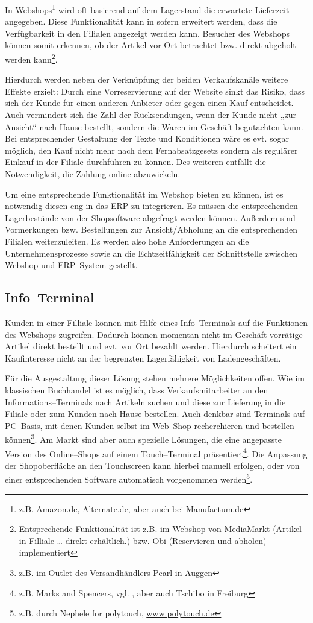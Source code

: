 In Webshops\footnote{z.B. Amazon.de, Alternate.de, aber auch bei Manufactum.de} wird oft basierend auf dem Lagerstand die erwartete Lieferzeit angegeben. Diese Funktionalität kann in sofern erweitert werden, dass die Verfügbarkeit in den Filialen angezeigt werden kann. Besucher des Webshops können somit erkennen, ob der Artikel vor Ort betrachtet bzw. direkt abgeholt werden kann\footnote{Entsprechende Funktionalität ist z.B. im Webshop von MediaMarkt (Artikel in Filliale … direkt erhältlich.) bzw. Obi (Reservieren und abholen) implementiert}. 

Hierdurch werden neben der Verknüpfung der beiden Verkaufskanäle weitere Effekte erzielt: Durch eine Vorreservierung auf der Website sinkt das Risiko, dass sich der Kunde für einen anderen Anbieter oder gegen einen Kauf entscheidet. Auch vermindert sich die Zahl der Rücksendungen, wenn der Kunde nicht „zur Ansicht“ nach Hause bestellt, sondern die Waren im Geschäft begutachten kann. Bei entsprechender Gestaltung der Texte und Konditionen wäre es evt. sogar möglich, den Kauf nicht mehr nach dem Fernabsatzgesetz sondern als regulärer Einkauf in der Filiale durchführen zu können. Des weiteren entfällt die Notwendigkeit, die Zahlung online abzuwickeln.

Um eine entsprechende Funktionalität im Webshop bieten zu können, ist es notwendig diesen eng in das \ac{ERP} zu integrieren. Es müssen die entsprechenden Lagerbestände von der Shopsoftware abgefragt werden können. Außerdem sind Vormerkungen bzw. Bestellungen zur Ansicht/Abholung an die entsprechenden Filialen weiterzuleiten.  Es werden also hohe Anforderungen an die Unternehmensprozesse sowie an die Echtzeitfähigkeit der Schnittstelle zwischen Webshop und ERP--System gestellt.

\subsection{Info--Terminal}

Kunden in einer Filliale können mit Hilfe eines Info–Terminals auf die Funktionen des Webshops zugreifen. Dadurch können momentan nicht im Geschäft vorrätige Artikel direkt bestellt und evt. vor Ort bezahlt werden. Hierdurch scheitert ein Kaufinteresse nicht an der begrenzten Lagerfähigkeit von Ladengeschäften.

Für die Ausgestaltung dieser Lösung stehen mehrere Möglichkeiten offen. Wie im klassischen Buchhandel ist es möglich, dass Verkaufsmitarbeiter an den Informations–Terminals nach Artikeln suchen und diese zur Lieferung in die Filiale oder zum Kunden nach Hause bestellen. Auch denkbar sind Terminals auf PC–Basis, mit denen Kunden selbst im Web–Shop recherchieren und bestellen können\footnote{z.B. im Outlet des Versandhändlers Pearl in Auggen}. Am Markt sind aber auch spezielle Lösungen, die eine angepasste Version des Online–Shops auf einem Touch–Terminal präsentiert\footnote{z.B. Marks and Spencers, vgl. \cite{intelms}, aber auch Tschibo in Freiburg}. Die Anpassung der Shopoberfläche an den Touchscreen kann hierbei manuell erfolgen, oder von einer entsprechenden Software automatisch vorgenommen werden\footnote{z.B. durch Nephele for polytouch, \url{www.polytouch.de}}.

